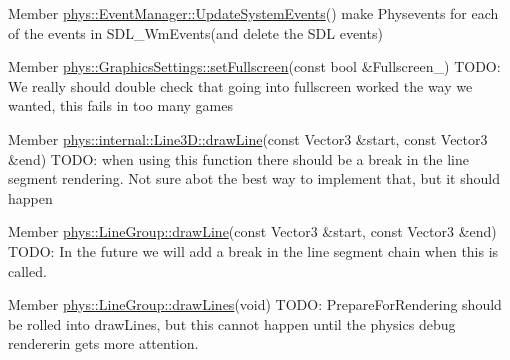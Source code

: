 \label{dd/da0/todo__todo000007}
\hypertarget{dd/da0/todo__todo000007}{}
 
\begin{DoxyDescription}
\item[Member \hyperlink{classphys_1_1EventManager_a0cf574c55def063d66d7db46a4d3e8a5}{phys::EventManager::UpdateSystemEvents}() ]make Physevents for each of the events in SDL\_\-WmEvents(and delete the SDL events) 
\end{DoxyDescription}

\label{dd/da0/todo__todo000009}
\hypertarget{dd/da0/todo__todo000009}{}
 
\begin{DoxyDescription}
\item[Member \hyperlink{classphys_1_1GraphicsSettings_aba9e127ab2cf3f20604313e39d32f7a8}{phys::GraphicsSettings::setFullscreen}(const bool \&Fullscreen\_\-) ]TODO: We really should double check that going into fullscreen worked the way we wanted, this fails in too many games 
\end{DoxyDescription}

\label{dd/da0/todo__todo000010}
\hypertarget{dd/da0/todo__todo000010}{}
 
\begin{DoxyDescription}
\item[Member \hyperlink{classphys_1_1internal_1_1Line3D_a31bf19dc06547cbe042e1ddfbcf672f3}{phys::internal::Line3D::drawLine}(const Vector3 \&start, const Vector3 \&end) ]TODO: when using this function there should be a break in the line segment rendering. Not sure abot the best way to implement that, but it should happen 
\end{DoxyDescription}

\label{dd/da0/todo__todo000012}
\hypertarget{dd/da0/todo__todo000012}{}
 
\begin{DoxyDescription}
\item[Member \hyperlink{classphys_1_1LineGroup_a141db62ea17d94b9bce421e5df5a8d89}{phys::LineGroup::drawLine}(const Vector3 \&start, const Vector3 \&end) ]TODO: In the future we will add a break in the line segment chain when this is called. 
\end{DoxyDescription}

\label{dd/da0/todo__todo000013}
\hypertarget{dd/da0/todo__todo000013}{}
 
\begin{DoxyDescription}
\item[Member \hyperlink{classphys_1_1LineGroup_ade1bb4f8e1164e1b8d7aeabbc970b79d}{phys::LineGroup::drawLines}(void) ]TODO: PrepareForRendering should be rolled into drawLines, but this cannot happen until the physics debug rendererin gets more attention. 
\end{DoxyDescription}

